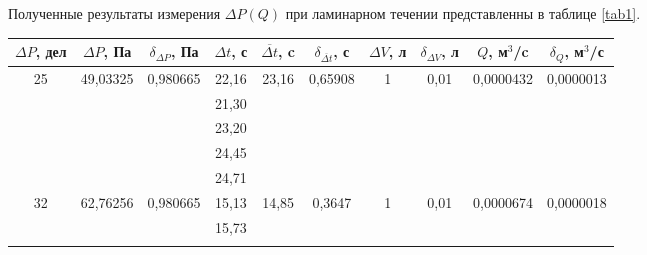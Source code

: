 \documentclass[a4paper, 12pt]{article}
\begin{document}
\par Полученные результаты измерения $\Delta{P}(Q)$ при ламинарном течении представленны в таблице \ref{tab1}.
\begin{table}[h!]
\begin{tabular}{|c|c|c|c|c|c|c|c|c|c|}
\hline
$\Delta{P}$, дел    & $\Delta{P}$, Па           & $\delta_{\Delta{P}}$, Па  & $\Delta{t}$, с & $\overline{\Delta{t}}$, c & $\delta_{\overline{\Delta{t}}}$, с & $\Delta{V}$, л     & $\delta_{\Delta{V}}$, л & $Q$, м$^3$/c      & $\delta_{Q}$, м$^3$/с \\ \hline
\multirow{5}{*}{25} & \multirow{5}{*}{49,03325} & \multirow{5}{*}{0,980665} & 22,16          & \multirow{5}{*}{23,16}    & \multirow{5}{*}{0,65908}           & \multirow{5}{*}{1} & \multirow{5}{*}{0,01}   & \multirow{5}{*}{0,0000432} & \multirow{5}{*}{0,0000013}    \\ \cline{4-4}
                    &                           &                           & 21,30          &                           &                                    &                    &                         &                            &                               \\ \cline{4-4}
                    &                           &                           & 23,20          &                           &                                    &                    &                         &                            &                               \\ \cline{4-4}
                    &                           &                           & 24,45          &                           &                                    &                    &                         &                            &                               \\ \cline{4-4}
                    &                           &                           & 24,71          &                           &                                    &                    &                         &                            &                               \\ \hline
\multirow{5}{*}{32} & \multirow{5}{*}{62,76256} & \multirow{5}{*}{0,980665} & 15,13          & \multirow{5}{*}{14,85}    & \multirow{5}{*}{0,3647}            & \multirow{5}{*}{1} & \multirow{5}{*}{0,01}   & \multirow{5}{*}{0,0000674} & \multirow{5}{*}{0,0000018}    \\ \cline{4-4}
                    &                           &                           & 15,73          &                           &                                    &                    &                         &                            &                               \\ \cline{4-4}

\end{tabular}
\end{table}
\end{document}
